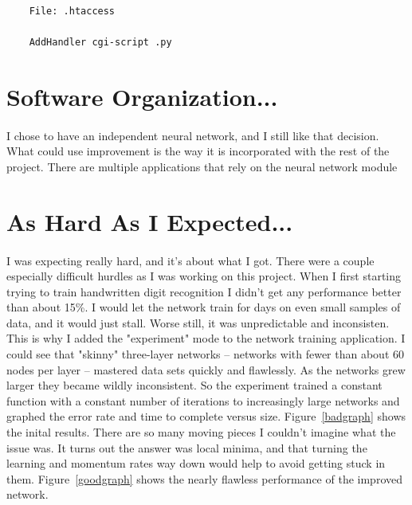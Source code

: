 \documentclass{article}
\begin{document}
    \begin{lstlisting}
    File: .htaccess

    AddHandler cgi-script .py
    \end{lstlisting}

\section{Software Organization...}

    \paragraph{}I chose to have an independent neural network, and I still like 
    that decision. What could use improvement is the way it is incorporated with 
    the rest of the project. There are multiple applications that rely on the 
    neural network module

\section{As Hard As I Expected...}

    \paragraph{}I was expecting really hard, and it's about what I got. There were 
    a couple especially difficult hurdles as I was working on this project. When I
    first starting trying to train handwritten digit recognition I didn't
    get any performance better than about 15\%. I would let the network train for 
    days on even small samples of data, and it would just stall. Worse still, it 
    was unpredictable and inconsisten. This is why I added the "experiment" mode 
    to the network training application. I could see that "skinny" three-layer 
    networks -- networks with fewer than about 60 nodes per layer -- mastered
    data sets quickly and flawlessly. As the networks grew larger they became 
    wildly inconsistent. So the experiment trained a constant function with a 
    constant number of iterations to increasingly large networks and graphed the 
    error rate and time to complete versus size. Figure~\ref{badgraph} shows the 
    inital results. There are so many moving pieces I couldn't imagine what the 
    issue was. It turns out the answer was local minima, and that turning the 
    learning and momentum rates way down would help to avoid getting stuck in them.
    Figure~\ref{goodgraph} shows the nearly flawless performance of the improved 
    network.
\end{document}
